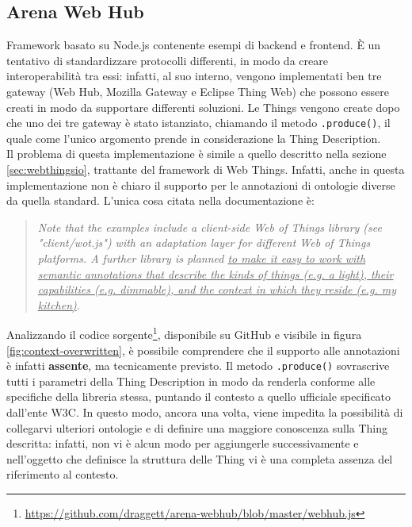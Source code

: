 \documentclass[12pt,a4paper,openright,oneside]{report}
\begin{document}
\subsection{Arena Web Hub}
Framework \cite{arenawh} basato su Node.js contenente esempi di backend e frontend. È un tentativo di standardizzare protocolli differenti, in modo da creare interoperabilità tra essi: infatti, al suo interno, vengono implementati ben tre gateway (Web Hub, Mozilla Gateway e Eclipse Thing Web) che possono essere creati in modo da supportare differenti soluzioni. Le Things vengono create dopo che uno dei tre gateway è stato istanziato, chiamando il metodo \texttt{.produce()}, il quale come l'unico argomento prende in considerazione la Thing Description.\\

Il problema di questa implementazione è simile a quello descritto nella sezione \ref{sec:webthingsio}, trattante del framework di Web Things. Infatti, anche in questa implementazione non è chiaro il supporto per le annotazioni di ontologie diverse da quella standard. L'unica cosa citata nella documentazione è:

\begin{quote}
\textit{Note that the examples include a client-side Web of Things library (see "client/wot.js") with an adaptation layer for different Web of Things platforms. A further library is planned \ul{to make it easy to work with semantic annotations that describe the kinds of things (e.g. a light), their capabilities (e.g. dimmable), and the context in which they reside (e.g. my kitchen)}.}
\end{quote}

Analizzando il codice sorgente\footnote{\url{https://github.com/draggett/arena-webhub/blob/master/webhub.js}}, disponibile su GitHub e visibile in figura \ref{fig:context-overwritten}, è possibile comprendere che il supporto alle annotazioni è infatti \textbf{assente}, ma tecnicamente previsto. Il metodo \texttt{.produce()} sovrascrive tutti i parametri della Thing Description in modo da renderla conforme alle specifiche della libreria stessa, puntando il contesto a quello ufficiale specificato dall'ente W3C. In questo modo, ancora una volta, viene impedita la possibilità di collegarvi ulteriori ontologie e di definire una maggiore conoscenza sulla Thing descritta: infatti, non vi è alcun modo per aggiungerle successivamente e nell'oggetto che definisce la struttura delle Thing vi è una completa assenza del riferimento al contesto.\\
\end{document}
